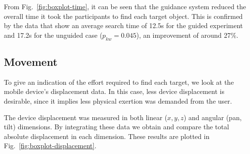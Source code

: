 \documentclass[runningheads]{llncs}
\newcommand\todo[1]{\textcolor{red}{#1}}
\begin{document}

From Fig.~\ref{fig:boxplot-time}, it can be seen that the guidance system reduced the overall time it took the participants to find each target object.
This is confirmed by the data that show an average search time of 12.5s for the guided experiment and 17.2s for the unguided case ($p_{kw}=0.045$), an improvement of around 27\%.

\subsection{Movement}

To give an indication of the effort required to find each target, we look at the mobile device's displacement data. 
In this case, less device displacement is desirable, since it implies less physical exertion was demanded from the user.%

The device displacement was measured in both linear ($x, y, z$) and angular (pan, tilt) dimensions.
By integrating these data we obtain and compare the total absolute displacement in each dimension.
These results are plotted in Fig.~\ref{fig:boxplot-displacement}.


\end{document}
